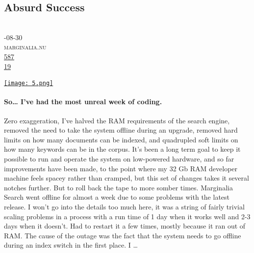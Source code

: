 \documentclass[10pt,a4paper]{article}
\begin{document}
\subsection{Absurd Success}
\noindent\begin{minipage}[t]{0.19\linewidth}
\vspace{0pt}
\noindent\scshape\footnotesize
\\ {\scriptsize\faCalendar}-08-30
\\ {\scriptsize\faGlobe}\space 
marginalia.nu
\\ {\scriptsize\faThumbsOUp}\space 
\href{http://news.ycombinator.com/item?id=37331778\&utm\_term=comment}{587} 
\\ {\scriptsize\faComments}\space 
\href{http://news.ycombinator.com/item?id=37331778\&utm\_term=comment}{19} 
\end{minipage} 
\begin{minipage}[t]{0.80\linewidth}
\vspace{0pt}
\begin{multicols}{2}
    \href{https://www.marginalia.nu/log/87\_absurd\_success/?utm\_source=hackernewsletter\&utm\_medium=email\&utm\_term=fav}{
        \texttt{[image: 5.png]}
    }
\paragraph{So… I’ve had the most unreal week of coding.}
 Zero exaggeration, I’ve halved the RAM requirements of the search engine, removed the need to take the system offline during an upgrade, removed hard limits on how many documents can be indexed, and quadrupled soft limits on how many keywords can be in the corpus.
It’s been a long term goal to keep it possible to run and operate the system on low-powered hardware, and so far improvements have been made, to the point where my 32 Gb RAM developer machine feels spacey rather than cramped, but this set of changes takes it several notches further.
But to roll back the tape to more somber times.
Marginalia Search went offline for almost a week due to some problems with the latest release.
I won’t go into the details too much here, it was a string of fairly trivial scaling problems in a process with a run time of 1 day when it works well and 2-3 days when it doesn’t. Had to restart it a few times, mostly because it ran out of RAM.
The cause of the outage was the fact that the system needs to go offline during an index switch in the first place. I
\dots
\end{multicols}
\end{minipage}
\par\medskip
\end{document}
